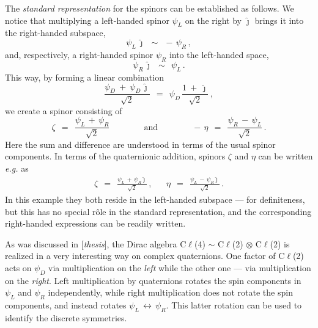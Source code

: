 \documentclass[epsfig,12pt]{article}
\newcommand{\jj}{\hat\jmath}
\begin{document}
	The \emph{standard representation} for the spinors can be established as follows.
	We notice that multiplying a left-handed spinor $ \psi_L $ on the right by $ \jj $
	brings it into the right-handed subspace,
\begin{equation}
	\psi_L\,\jj	~~\sim~~	-\,\psi_R\,,
\end{equation}
	and, respectively, a right-handed spinor $ \psi_R $ into the left-handed space,
\begin{equation}
	\psi_R\,\jj	~~\sim~~	\psi_L\,.
\end{equation}
	This way, by forming a linear combination
\begin{equation}
	\frac{\psi_D  ~+~  \psi_D\,\jj}{\sqrt 2}	~~=~~	\psi_D\, \frac{ 1 ~+~ \jj }{\sqrt 2}\,,
\end{equation}
	we create a spinor consisting of
\begin{equation}
	\zeta	~~=~~	\frac{\psi_L \,+\, \psi_R}{\sqrt 2}
	\qquad\qquad\text{and}\qquad\qquad
	-\,\eta	~~=~~	\frac{\psi_R \,-\, \psi_L}{\sqrt 2}\,.
\end{equation}
	Here the sum and difference are understood in terms of the usual spinor components.
	In terms of the quaternionic addition, spinors $ \zeta $ and $ \eta $
	can be written \emph{e.g.} as
\begin{align}
	\zeta	~~=~~	\frac{\psi_L \,+\, \psi_R \jj}{\sqrt{2}}\,,
	&&
	\eta	~~=~~	\frac{\psi_L \,-\, \psi_R \jj}{\sqrt{2}}\,.
\end{align}
	In this example they both reside in the left-handed subspace --- for definiteness,
	but this has no special r\^ole in the standard representation,
	and the corresponding right-handed expressions can be readily written.

	As was discussed in [\emph{thesis}], the Dirac algebra
	C$\ell$(4) $ \sim $  C$\ell$(2) $ \otimes $ C$\ell$(2)
	is realized in a very interesting way on complex quaternions.
	One factor of C$\ell$(2) acts on $ \psi_D $ via multiplication on the \emph{left}
	while the other one --- via multiplication on the \emph{right}.
	Left multiplication by quaternions rotates the spin components in 
	$ \psi_L $ and $ \psi_R $ independently, while right multiplication
	does not rotate the spin components, and instead rotates 
	$ \psi_L \,\leftrightarrow\, \psi_R $.
	This latter rotation can be used to identify the discrete symmetries.


\end{document}
